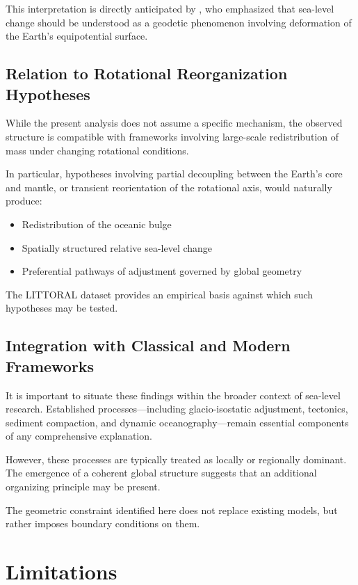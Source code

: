 \documentclass[twocolumn]{article}
\begin{document}
This interpretation is directly anticipated by \citet{fairbridge1961}, who emphasized that sea-level change should be understood as a geodetic phenomenon involving deformation of the Earth's equipotential surface.

\subsection{Relation to Rotational Reorganization Hypotheses}

While the present analysis does not assume a specific mechanism, the observed structure is compatible with frameworks involving large-scale redistribution of mass under changing rotational conditions.

In particular, hypotheses involving partial decoupling between the Earth's core and mantle, or transient reorientation of the rotational axis, would naturally produce:

\begin{itemize}
\item Redistribution of the oceanic bulge
\item Spatially structured relative sea-level change
\item Preferential pathways of adjustment governed by global geometry
\end{itemize}

The LITTORAL dataset provides an empirical basis against which such hypotheses may be tested.

\subsection{Integration with Classical and Modern Frameworks}

It is important to situate these findings within the broader context of sea-level research. Established processes---including glacio-isostatic adjustment, tectonics, sediment compaction, and dynamic oceanography---remain essential components of any comprehensive explanation.

However, these processes are typically treated as locally or regionally dominant. The emergence of a coherent global structure suggests that an additional organizing principle may be present.

The geometric constraint identified here does not replace existing models, but rather imposes boundary conditions on them.

\section{Limitations}
\end{document}
